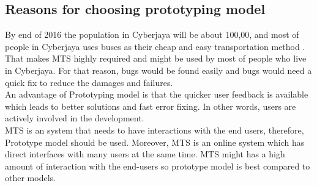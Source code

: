 \pagebreak
\subsection{Reasons for choosing prototyping model}
By end of 2016 the population in Cyberjaya will be about 100,00, and most of people in Cyberjaya uses buses as their cheap and easy transportation method \cite{ReferencePopulationOfCyberjaya}. That makes MTS highly required and might be used by most of people who live in Cyberjaya. For that reason, bugs would be found easily and bugs would need a quick fix to reduce the damages and failures.\\

An advantage of Prototyping model is that the quicker user feedback is available which leads to better solutions and fast error fixing. In other words, users are actively involved in the development.\\

MTS is an system that needs to have interactions with the end users, therefore, Prototype model should be used. Moreover, MTS is an online system which has direct interfaces with many users at the same time. MTS might has a high amount of interaction with the end-users so prototype model is best compared to other models.\\